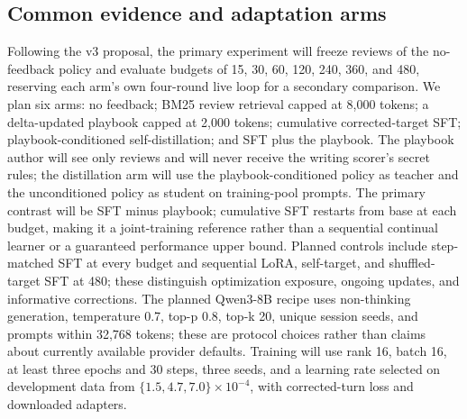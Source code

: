 \documentclass[10pt,twocolumn,letterpaper]{article}
\newcommand{\claim}[2]{#2}
\begin{document}
\subsection{Common evidence and adaptation arms}
\claim{C43}{Following the v3 proposal, the primary experiment will freeze reviews of the no-feedback policy and evaluate budgets of 15, 30, 60, 120, 240, 360, and 480, reserving each arm's own four-round live loop for a secondary comparison.}
\claim{C44}{We plan six arms: no feedback; BM25 review retrieval capped at 8,000 tokens; a delta-updated playbook capped at 2,000 tokens; cumulative corrected-target SFT; playbook-conditioned self-distillation; and SFT plus the playbook.}
\claim{C45}{The playbook author will see only reviews and will never receive the writing scorer's secret rules; the distillation arm will use the playbook-conditioned policy as teacher and the unconditioned policy as student on training-pool prompts.}
\claim{C46}{The primary contrast will be SFT minus playbook; cumulative SFT restarts from base at each budget, making it a joint-training reference rather than a sequential continual learner or a guaranteed performance upper bound.}
\claim{C47}{Planned controls include step-matched SFT at every budget and sequential LoRA, self-target, and shuffled-target SFT at 480; these distinguish optimization exposure, ongoing updates, and informative corrections.}
\claim{C48}{The planned Qwen3-8B recipe uses non-thinking generation, temperature 0.7, top-p 0.8, top-k 20, unique session seeds, and prompts within 32,768 tokens; these are protocol choices rather than claims about currently available provider defaults.}
\claim{C49}{Training will use rank 16, batch 16, at least three epochs and 30 steps, three seeds, and a learning rate selected on development data from $\{1.5,4.7,7.0\}\times10^{-4}$, with corrected-turn loss and downloaded adapters.}
\end{document}
